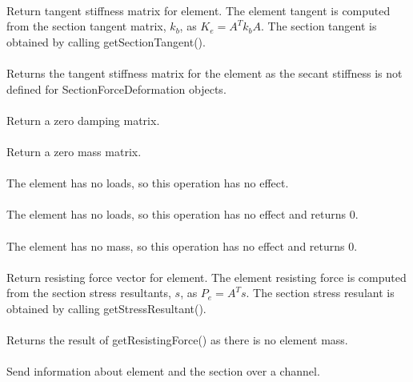  \\
Return tangent stiffness matrix for element.  The element tangent is computed
from the section tangent matrix, $k_b$, as $K_e = A^T k_b A$.  The section
tangent is obtained by calling getSectionTangent().
\\

 \\    
Returns the tangent stiffness matrix for the element as the secant stiffness
is not defined for SectionForceDeformation objects.
\\

 \\    
Return a zero damping matrix.
\\

 \\    
Return a zero mass matrix.
\\

 \\	
The element has no loads, so this operation has no effect.
\\

 \\
The element has no loads, so this operation has no effect and returns 0.
\\

 \\    
The element has no mass, so this operation has no effect and returns 0.
\\

 \\
Return resisting force vector for element.  The element resisting force is computed
from the section stress resultants, $s$, as $P_e = A^T s$.  The section
stress resulant is obtained by calling getStressResultant().
\\

 \\            
Returns the result of getResistingForce() as there is no element mass.
\\

 \\
Send information about element and the section over a channel.
\\

